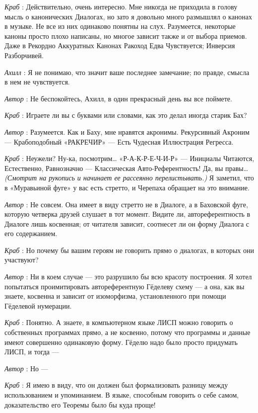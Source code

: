 \emph{Краб} : Действительно, очень интересно. Мне никогда не приходила в голову мысль о канонических Диалогах, но зато я довольно много размышлял о канонах в музыке. Не все из них одинаково понятны на слух. Разумеется, некоторые каноны просто плохо написаны, но многое зависит также и от выбора приемов. Даже в Рекордно Аккуратных Канонах Ракоход Едва Чувствуется; Инверсия Разборчивей.

\emph{Ахилл} : Я не понимаю, что значит ваше последнее замечание; по правде, смысла в нем не чувствуется.

\emph{Автор} : Не беспокойтесь, Ахилл, в один прекрасный день вы все поймете.

\emph{Краб} : Играете ли вы с буквами или словами, как это делал иногда старик Бах?

\emph{Автор} : Разумеется. Как и Баху, мне нравятся акронимы. Рекурсивный Акроним --- Крабоподобный «РАКРЕЧИР» --- Есть Чудесная Иллюстрация Регресса.

\emph{Краб} : Неужели? Ну-ка, посмотрим\ldots{} «Р-А-К-Р-Е-Ч-И-Р» --- Инициалы Читаются, Естественно, Равнозначно --- Классическая Авто-Референтность! Да, вы правы\ldots{} \emph{(Смотрит на рукопись и начинает ее рассеянно перелистывать.)} Я заметил, что в «Муравьиной фуге» у вас есть стретто, и Черепаха обращает на это внимание.

\emph{Автор} : Не совсем. Она имеет в виду стретто не в Диалоге, а в Баховской фуге, которую четверка друзей слушает в тот момент. Видите ли, автореферентность в Диалоге лишь косвенная; от читателя зависит, соотнесет ли он форму Диалога с его содержанием.

\emph{Краб} : Но почему бы вашим героям не говорить прямо о диалогах, в которых они участвуют?

\emph{Автор} : Ни в коем случае --- это разрушило бы всю красоту построения. Я хотел попытаться проимитировать автореферентную Гёделеву схему --- а она, как вы знаете, косвенна и зависит от изоморфизма, установленного при помощи Гёделевой нумерации.

\emph{Краб} : Понятно. А знаете, в компьютерном языке ЛИСП можно говорить о собственных программах прямо, а не косвенно, потому что программы и данные имеют совершенно одинаковую форму. Гёделю надо было просто придумать ЛИСП, и тогда ---

\emph{Автор} : Но ---

\emph{Краб} : Я имею в виду, что он должен был формализовать разницу между использованием и упоминанием. В языке, способным говорить о себе самом, доказательство его Теоремы было бы куда проще!

